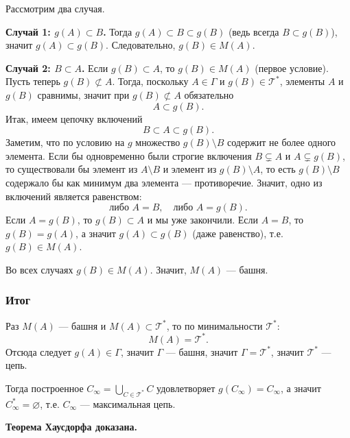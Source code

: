 Рассмотрим два случая.

\medskip
\noindent\textbf{Случай 1: $g(A)\subset B$.}
Тогда $g(A)\subset B\subset g(B)$ (ведь всегда $B\subset g(B)$), значит $g(A)\subset g(B)$.
Следовательно, $g(B)\in M(A)$.

\medskip
\noindent\textbf{Случай 2: $B\subset A$.}
Если $g(B)\subset A$, то $g(B)\in M(A)$ (первое условие).
Пусть теперь $g(B)\not\subset A$. Тогда, поскольку $A\in\Gamma$ и $g(B)\in\mathcal T^{*}$,
элементы $A$ и $g(B)$ сравнимы, значит при $g(B)\not\subset A$ обязательно
\[
    A\subset g(B).
\]
Итак, имеем цепочку включений
\[
    B\subset A\subset g(B).
\]
Заметим, что по условию на $g$ множество $g(B)\setminus B$ содержит не более одного элемента.
Если бы одновременно были строгие включения $B\subsetneq A$ и $A\subsetneq g(B)$, то существовали бы
элемент из $A\setminus B$ и элемент из $g(B)\setminus A$, то есть $g(B)\setminus B$ содержало бы
как минимум два элемента --- противоречие. Значит, одно из включений является равенством:
\[
    \text{либо }A=B,\quad \text{либо }A=g(B).
\]
Если $A=g(B)$, то $g(B)\subset A$ и мы уже закончили.
Если $A=B$, то $g(B)=g(A)$, а значит $g(A)\subset g(B)$ (даже равенство), т.е. $g(B)\in M(A)$.

\medskip

Во всех случаях $g(B)\in M(A)$. Значит, $M(A)$ --- башня.

\subsubsection*{Итог}
Раз $M(A)$ --- башня и $M(A)\subset\mathcal T^{*}$, то по минимальности $\mathcal T^{*}$:
\[
    M(A)=\mathcal T^{*}.
\]
Отсюда следует $g(A)\in\Gamma$, значит $\Gamma$ --- башня, значит $\Gamma=\mathcal T^{*}$,
значит $\mathcal T^{*}$ --- цепь.

Тогда построенное $C_{\infty}=\bigcup_{C\in\mathcal T^{*}}C$ удовлетворяет $g(C_{\infty})=C_{\infty}$,
а значит $C_{\infty}^{*}=\varnothing$, т.е. $C_{\infty}$ --- максимальная цепь.

\medskip
\begin{center}
    \textbf{Теорема Хаусдорфа доказана.}
\end{center}

